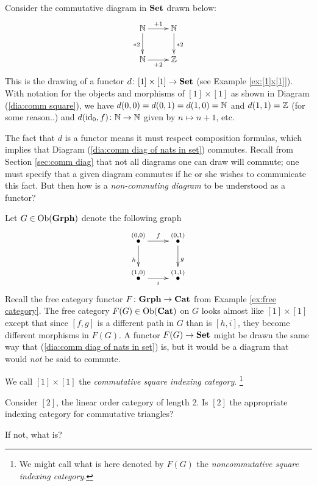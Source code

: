 \begin{example}\label{ex:comm vs noncomm diags}

Consider the commutative diagram in ${\bf Set}$ drawn below:
\begin{align}\label{dia:comm diag of nats in set}
\xymatrix{\NN\ar[r]^{+1}\ar[d]_{*2}&\NN\ar[d]^{*2}\\\NN\ar[r]_{+2}&\ZZ}
\end{align}
This is the drawing of a functor $d\colon[1]\times[1]\rightarrow{\bf Set}$ (see Example \ref{ex:[1]x[1]}). With notation for the objects and morphisms of $[1]\times[1]$ as shown in Diagram (\ref{dia:comm square}), we have $d(0,0)=d(0,1)=d(1,0)={\mathbb N}$ and $d(1,1)={\mathbb Z}$ (for some reason..) and $d(\textnormal{id}_0,f)\colon{\mathbb N}\rightarrow{\mathbb N}$ given by $n\mapsto n+1$, etc. 

The fact that $d$ is a functor means it must respect composition formulas, which implies that Diagram (\ref{dia:comm diag of nats in set}) commutes. Recall from Section \ref{sec:comm diag} that not all diagrams one can draw will commute; one must specify that a given diagram commutes if he or she wishes to communicate this fact. But then how is a {\em non-commuting diagram} to be understood as a functor?

Let $G\in\textnormal{Ob}({\bf Grph})$ denote the following graph 
$$\xymatrix{\LMO{(0,0)}\ar[r]^f\ar[d]_h&\LMO{(0,1)}\ar[d]^{g}\\\LMO{(1,0)}\ar[r]_{i}&\LMO{(1,1)}}$$
Recall the free category functor $F\colon{\bf Grph}\rightarrow{\bf Cat}$ from Example \ref{ex:free category}. The free category $F(G)\in\textnormal{Ob}({\bf Cat})$ on $G$ looks almost like $[1]\times[1]$ except that since $[f,g]$ is a different path in $G$ than is $[h,i]$, they become different morphisms in $F(G)$. A functor $F(G)\rightarrow{\bf Set}$ might be drawn the same way that (\ref{dia:comm diag of nats in set}) is, but it would be a diagram that would {\em not} be said to commute.

We call $[1]\times [1]$ the {\em commutative square indexing category}. 
\footnote{We might call what is here denoted by $F(G)$ the {\em noncommutative square indexing category}.}

\end{example}

\begin{exercise}
Consider $[2]$, the linear order category of length 2.
\sexc Is $[2]$ the appropriate indexing category for commutative triangles?
\item If not, what is?
\endsexc
\end{exercise}

